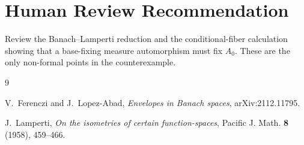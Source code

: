 \documentclass[11pt]{article}
\begin{document}
\section*{Human Review Recommendation}

Review the Banach--Lamperti reduction and the conditional-fiber calculation
showing that a base-fixing measure automorphism must fix \(A_0\).  These are
the only non-formal points in the counterexample.

\begin{thebibliography}{9}

V.~Ferenczi and J.~Lopez-Abad,
\emph{Envelopes in Banach spaces},
arXiv:2112.11795.

J.~Lamperti,
\emph{On the isometries of certain function-spaces},
Pacific J. Math. \textbf{8} (1958), 459--466.

\end{thebibliography}
\end{document}
